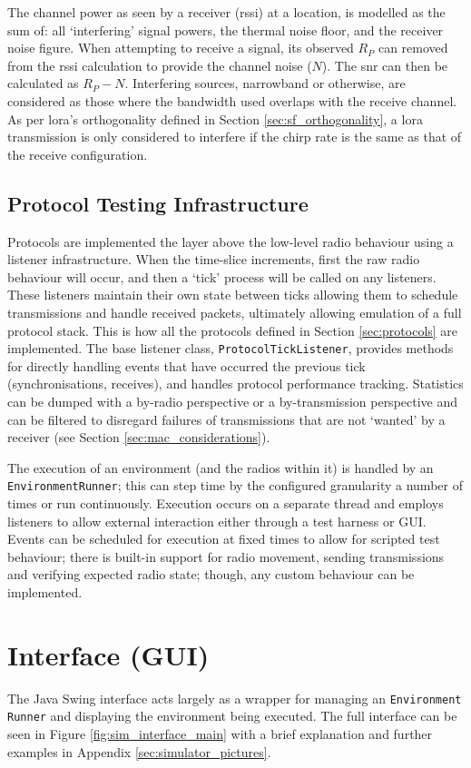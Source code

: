The channel power as seen by a receiver (\ac{rssi}) at a location, is modelled as the sum of: all `interfering' signal powers, the thermal noise floor, and the receiver noise figure. When attempting to receive a signal, its observed $R_P$ can removed from the \ac{rssi} calculation to provide the channel noise ($N$). The \ac{snr} can then be calculated as $R_P - N$. Interfering sources, narrowband or otherwise, are considered as those where the bandwidth used overlaps with the receive channel. As per \ac{lora}'s orthogonality defined in Section \ref{sec:sf_orthogonality}, a \ac{lora} transmission is only considered to interfere if the chirp rate is the same as that of the receive configuration.


\subsection{Protocol Testing Infrastructure}
Protocols are implemented the layer above the low-level radio behaviour using a listener infrastructure. When the time-slice increments, first the raw radio behaviour will occur, and then a `tick' process will be called on any listeners. These listeners maintain their own state between ticks allowing them to schedule transmissions and handle received packets, ultimately allowing emulation of a full protocol stack. This is how all the protocols defined in Section \ref{sec:protocols} are implemented. The base listener class, \texttt{ProtocolTickListener}, provides methods for directly handling events that have occurred the previous tick (synchronisations, receives), and handles protocol performance tracking. Statistics can be dumped with a by-radio perspective or a by-transmission perspective and can be filtered to disregard failures of transmissions that are not `wanted' by a receiver (see Section \ref{sec:mac_considerations}).

The execution of an environment (and the radios within it) is handled by an \texttt{EnvironmentRunner}; this can step time by the configured granularity a number of times or run continuously. Execution occurs on a separate thread and employs listeners to allow external interaction either through a test harness or GUI. Events can be scheduled for execution at fixed times to allow for scripted test behaviour; there is built-in support for radio movement, sending transmissions and verifying expected radio state; though, any custom behaviour can be implemented. 


\section{Interface (GUI)}
The Java Swing interface acts largely as a wrapper for managing an \texttt{Environment} \texttt{Runner} and displaying the environment being executed. The full interface can be seen in Figure \ref{fig:sim_interface_main} with a brief explanation and further examples in Appendix \ref{sec:simulator_pictures}. 

